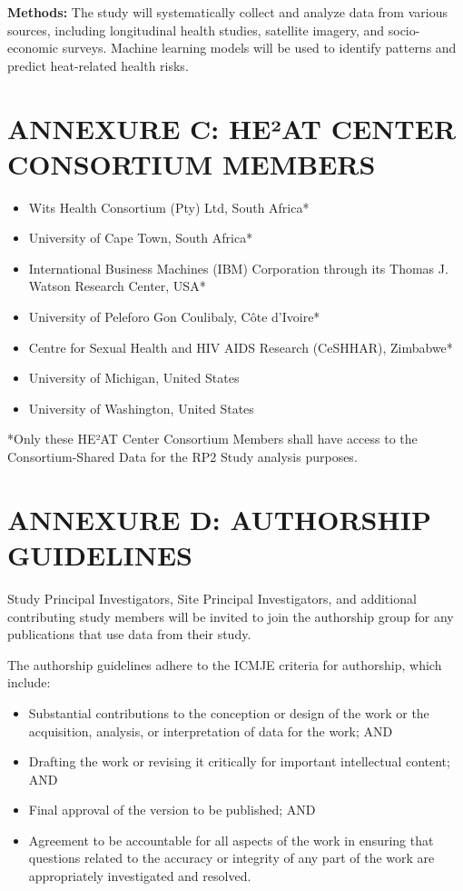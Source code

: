 \documentclass[12pt,letterpaper]{article}
\begin{document}
\textbf{Methods:} The study will systematically collect and analyze data from various sources, including longitudinal health studies, satellite imagery, and socio-economic surveys. Machine learning models will be used to identify patterns and predict heat-related health risks.

\section*{ANNEXURE C: HE²AT CENTER CONSORTIUM MEMBERS}

\begin{itemize}
    \item Wits Health Consortium (Pty) Ltd, South Africa*
    \item University of Cape Town, South Africa*
    \item International Business Machines (IBM) Corporation through its Thomas J. Watson Research Center, USA*
    \item University of Peleforo Gon Coulibaly, Côte d'Ivoire*
    \item Centre for Sexual Health and HIV AIDS Research (CeSHHAR), Zimbabwe*
    \item University of Michigan, United States
    \item University of Washington, United States
\end{itemize}

*Only these HE²AT Center Consortium Members shall have access to the Consortium-Shared Data for the RP2 Study analysis purposes.

\section*{ANNEXURE D: AUTHORSHIP GUIDELINES}

Study Principal Investigators, Site Principal Investigators, and additional contributing study members will be invited to join the authorship group for any publications that use data from their study.

The authorship guidelines adhere to the ICMJE criteria for authorship, which include:
\begin{itemize}
    \item Substantial contributions to the conception or design of the work or the acquisition, analysis, or interpretation of data for the work; AND
    \item Drafting the work or revising it critically for important intellectual content; AND
    \item Final approval of the version to be published; AND
    \item Agreement to be accountable for all aspects of the work in ensuring that questions related to the accuracy or integrity of any part of the work are appropriately investigated and resolved.
\end{itemize}
\end{document}
